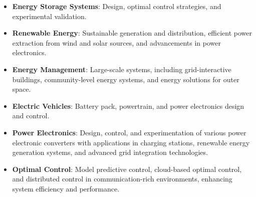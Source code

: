 \documentclass[10pt,letter]{article}
\begin{document}
\begin{small}
\begin{itemize}
	\setlength\itemsep{1em}
	\item{\bf Energy Storage Systems}: Design, optimal control strategies, and experimental validation.	
	\item{\bf Renewable Energy}: Sustainable generation and distribution, efficient power extraction from wind and solar sources, and advancements in power electronics.
	\item{\bf Energy Management}: Large-scale systems, including grid-interactive buildings, community-level energy systems, and energy solutions for outer space.
	\item{\bf Electric Vehicles}: Battery pack, powertrain, and power electronics design and control.
	\item{\bf Power Electronics}: Design, control, and experimentation of various power electronic converters with applications in charging stations, renewable energy generation systems, and advanced grid integration technologies.
	\item{\bf Optimal Control}: Model predictive control, cloud-based optimal control, and distributed control in communication-rich environments, enhancing system efficiency and performance.
\end{itemize}

%
%
%


\end{small}
\end{document}
